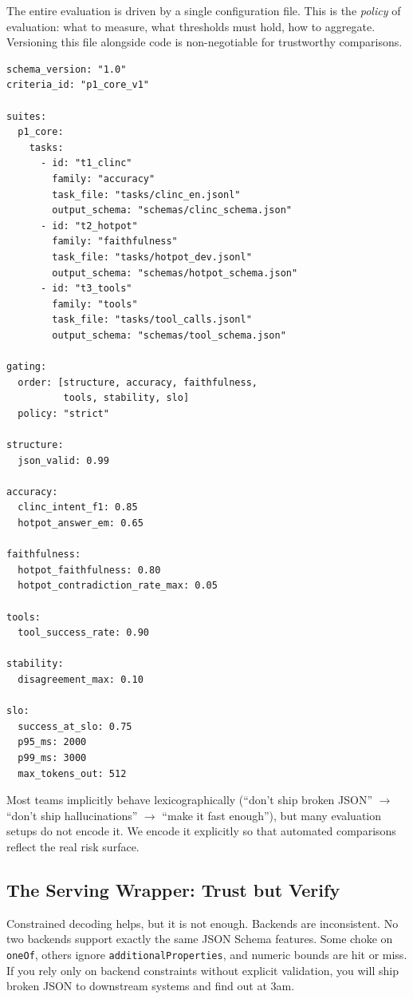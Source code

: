 \documentclass[11pt]{article}
\begin{document}
The entire evaluation is driven by a single configuration file.
This is the \emph{policy} of evaluation: what to measure, what thresholds must hold, how to aggregate.
Versioning this file alongside code is non-negotiable for trustworthy comparisons.

\begin{lstlisting}
schema_version: "1.0"
criteria_id: "p1_core_v1"

suites:
  p1_core:
    tasks:
      - id: "t1_clinc"
        family: "accuracy"
        task_file: "tasks/clinc_en.jsonl"
        output_schema: "schemas/clinc_schema.json"
      - id: "t2_hotpot"
        family: "faithfulness"
        task_file: "tasks/hotpot_dev.jsonl"
        output_schema: "schemas/hotpot_schema.json"
      - id: "t3_tools"
        family: "tools"
        task_file: "tasks/tool_calls.jsonl"
        output_schema: "schemas/tool_schema.json"

gating:
  order: [structure, accuracy, faithfulness,
          tools, stability, slo]
  policy: "strict"

structure:
  json_valid: 0.99

accuracy:
  clinc_intent_f1: 0.85
  hotpot_answer_em: 0.65

faithfulness:
  hotpot_faithfulness: 0.80
  hotpot_contradiction_rate_max: 0.05

tools:
  tool_success_rate: 0.90

stability:
  disagreement_max: 0.10

slo:
  success_at_slo: 0.75
  p95_ms: 2000
  p99_ms: 3000
  max_tokens_out: 512
\end{lstlisting}

Most teams implicitly behave lexicographically (``don't ship broken JSON'' $\rightarrow$ ``don't ship hallucinations'' $\rightarrow$ ``make it fast enough''), but many evaluation setups do not encode it.
We encode it explicitly so that automated comparisons reflect the real risk surface.

\subsection{The Serving Wrapper: Trust but Verify}

Constrained decoding helps, but it is not enough.
Backends are inconsistent.
No two backends support exactly the same JSON Schema features.
Some choke on \texttt{oneOf}, others ignore \texttt{additionalProperties}, and numeric bounds are hit or miss.
If you rely only on backend constraints without explicit validation, you will ship broken JSON to downstream systems and find out at 3am.
\end{document}
